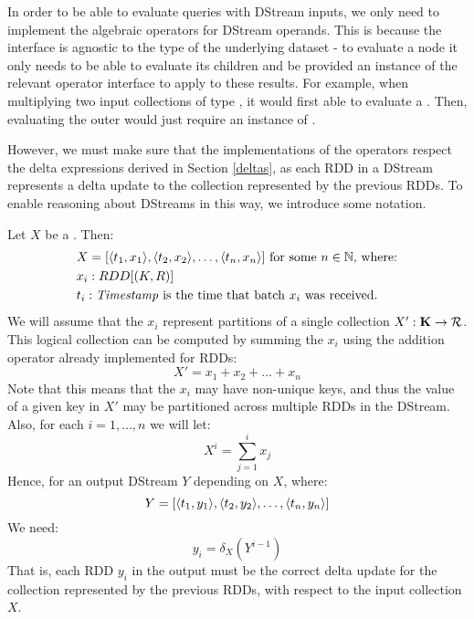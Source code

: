 In order to be able to evaluate queries with DStream inputs, we only need to implement the algebraic operators for DStream operands.  This is because the  interface is agnostic to the type of the underlying dataset - to evaluate a node it only needs to be able to evaluate its children and be provided an instance of the relevant operator interface to apply to these results. For example, when multiplying two input collections of type , it would first able to evaluate a . Then, evaluating the outer  would just require an instance of .

However, we must make sure that the implementations of the operators respect the delta expressions derived in Section \ref{deltas}, as each RDD in a DStream represents a delta update to the collection represented by the previous RDDs. To enable reasoning about DStreams in this way, we introduce some notation.
\par \noindent Let $X$ be a . Then:
\begin{equation*}
\begin{split}
&X = [\langle t_1, x_1 \rangle, \langle t_2, x_2 \rangle, \dots, \langle t_n, x_n \rangle] \textrm{ for some $n \in \mathbb{N}$, where:} \\
&x_i: RDD[(K,R)] \\
&t_i: \textrm{\textit{Timestamp}} \textrm{ is the time that batch $x_i$ was received.}
\end{split}
\end{equation*}
We will assume that the $x_i$ represent partitions of a single collection $X': \mathbf{K} \rightarrow \mathcal{R}$. This logical collection can be computed by summing the $x_i$ using the addition operator already implemented for RDDs:
\begin{equation*}
X' = x_1 + x_2 + \dots + x_n
\end{equation*}
Note that this means that the $x_i$ may have non-unique keys, and thus the value of a given key in $X'$ may be partitioned across multiple RDDs in the DStream.
\vs
Also, for each $i = 1, \dots, n$ we will let:
\begin{equation*}
X^i = \sum_{j = 1}^i{x_j}
\end{equation*}
Hence, for an output DStream $Y$ depending on $X$, where:
\begin{equation*}
Y = [\langle t_1, y_1 \rangle, \langle t_2, y_2 \rangle, \dots, \langle t_n, y_n \rangle]
\end{equation*}
We need:
\begin{equation*}
y_i = \delta_X(Y^{i-1})
\end{equation*}
That is, each RDD $y_i$ in the output must be the correct delta update for the collection represented by the previous RDDs, with respect to the input collection $X$.

